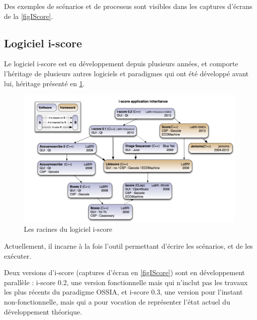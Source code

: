 Des exemples de scénarios et de processus sont visibles dans les captures d'écrans de la \cref{figIScore}.

\subsection{Logiciel i-score}
Le logiciel i-score est en développement depuis plusieurs années, et comporte l'héritage de plusieurs autres logiciels et paradigmes qui ont été développé avant lui, héritage présenté en \cref{figheritageIScore}.

\begin{figure}[H]
	\centering
	\includegraphics[scale=0.35]{images/iscoreHeritage.png}
	\caption{Les racines du logiciel i-score}
	\label{figheritageIScore}
\end{figure}

Actuellement, il incarne à la fois l'outil permettant d'écrire les scénarios, et de les exécuter.

Deux versions d'i-score (captures d'écran en \cref{figIScore}) sont en développement parallèle : i-score 0.2, une version fonctionnelle mais qui n'inclut pas les travaux les plus récents du paradigme \ac{OSSIA}, et i-score 0.3, une version pour l'instant non-fonctionnelle, mais qui a pour vocation de représenter l'état actuel du développement théorique.

